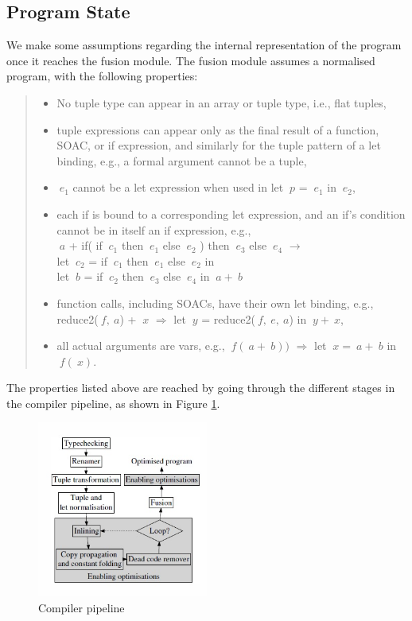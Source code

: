 \documentclass[11pt,bibliography=totocnumbered]{article}
\begin{document}
\subsection{Program State}
We make some assumptions regarding the internal representation of the program once it reaches the fusion module. The fusion module assumes a normalised program, with the following properties: 
\begin{quote}
\begin{itemize}
\item No tuple type can appear in an array or tuple type, i.e., flat
tuples,
\item tuple expressions can appear only as the final result of a function,
SOAC, or if expression, and similarly for the tuple pattern
of a let binding, e.g., a formal argument cannot be a tuple,
\item $\: e_1$ cannot be a let expression when used in let $\: p$ = $\: e_1$ in $\: e_2$,
\item each if is bound to a corresponding let expression, and
an if’s condition cannot be in itself an if expression, e.g., \\
$\: a$ + if( if $\: c_1$ then $\: e_1$ else $\: e_2$ ) then $\: e_3$ else $\: e_4$ $\rightarrow$ \\
let $\: c_2$ = if $\: c_1$ then $\: e_1$ else $\: e_2$ in \\
let $\: b$ = if $\: c_2$ then $\: e_3$ else $\: e_4$ in $\: a+ \:b$ 
\item function calls, including SOACs, have their own let binding, e.g., \\
reduce2($\:f,\:a$) + $\:x$ $\Rightarrow$ let $\:y$ = reduce2($\:f,\:e,\:a$) in $\:y+\:x$,
\item all actual arguments are vars, e.g., $\:f(\:a+\:b))$ $\Rightarrow$ let $\:x=\:a+\:b$ in $\:f(\:x)$.\\ \cite[Figure 5, p.4]{T2Fusion}
\end{itemize}
\end{quote} 
The properties listed above are reached by going through the different stages in the compiler pipeline, as shown in Figure \ref{fig:pipeline}.
\begin{figure}[hb!]
  \centering
    \includegraphics[width=0.5\textwidth]{images/pipeline.jpg}
  \caption{Compiler pipeline \cite[p. 4]{T2Fusion}}
  \label{fig:pipeline}
\end{figure}
\end{document}
